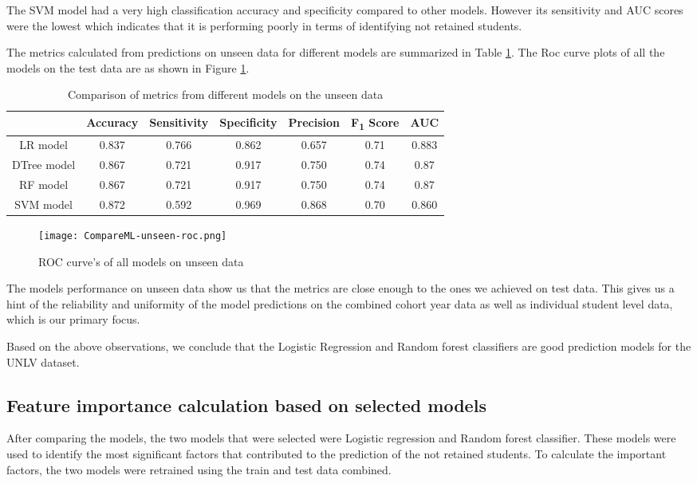 \documentclass[11pt,openright]{report}
\begin{document}
The SVM model had a very high classification accuracy and specificity compared to other models. However its sensitivity and AUC scores were the lowest which indicates that it is performing poorly in terms of identifying not retained students. 

The metrics calculated from predictions on unseen data for different models are summarized in Table \ref{table:compare_models_unseen_db}. The Roc curve plots of all the models on the test data are as shown in Figure \ref{fig:comparison_roc}.

\begin{table}[!htb]
	\renewcommand{\arraystretch}{1.3}
	\caption{Comparison of metrics from different models on the unseen data}
	\label{table:compare_models_unseen_db}
	\centering
	\begin{tabular}{|c|c|c|c|c|c|c|}
    \hline
  	 & \bfseries Accuracy & \bfseries Sensitivity & \bfseries Specificity & \bfseries Precision & \bfseries F\textsubscript{1} Score  & \bfseries AUC\\  
    \hline
        LR model & 0.837 & 0.766 & 0.862 & 0.657 & 0.71 & 0.883 \\ \hline
        DTree model & 0.867 & 0.721 & 0.917 & 0.750 & 0.74 & 0.87 \\ \hline
        RF model & 0.867 & 0.721 & 0.917 & 0.750 & 0.74 & 0.87 \\ \hline
        SVM model & 0.872 & 0.592 & 0.969 & 0.868 & 0.70 & 0.860 \\ \hline
	\end{tabular} 
\end{table}


 \begin{figure}[!htb]
	\centering
	\texttt{[image: CompareML-unseen-roc.png]}
	\caption{ROC curve's of all models on unseen data}
	\label{fig:comparison_roc}
\end{figure} 

The models performance on unseen data show us that the metrics are close enough to the ones we achieved on test data. This gives us a hint of the reliability and uniformity of the model predictions on the combined cohort year data as well as individual student level data, which is our primary focus.

Based on the above observations, we conclude that the Logistic Regression and Random forest classifiers are good prediction models for the UNLV dataset.



\subsection{Feature importance calculation based on selected models} 
After comparing the models, the two models that were selected were Logistic regression and Random forest classifier. These models were used to identify the most significant factors that contributed to the prediction of the not retained students. To calculate the important factors, the two models were retrained using the train and test data combined.
\end{document}
